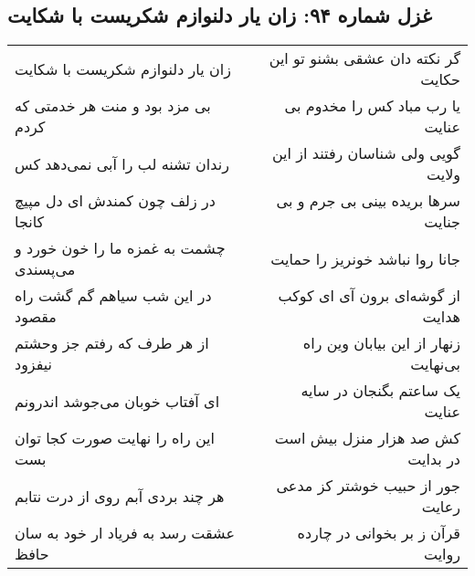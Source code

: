 \begin{center}
\section*{غزل شماره ۹۴: زان یار دلنوازم شکریست با شکایت}
\label{sec:sh094}
\begin{longtable}{l p{0.5cm} r}
زان یار دلنوازم شکریست با شکایت
&&
گر نکته دان عشقی بشنو تو این حکایت
\\
بی مزد بود و منت هر خدمتی که کردم
&&
یا رب مباد کس را مخدوم بی عنایت
\\
رندان تشنه لب را آبی نمی‌دهد کس
&&
گویی ولی شناسان رفتند از این ولایت
\\
در زلف چون کمندش ای دل مپیچ کانجا
&&
سرها بریده بینی بی جرم و بی جنایت
\\
چشمت به غمزه ما را خون خورد و می‌پسندی
&&
جانا روا نباشد خونریز را حمایت
\\
در این شب سیاهم گم گشت راه مقصود
&&
از گوشه‌ای برون آی ای کوکب هدایت
\\
از هر طرف که رفتم جز وحشتم نیفزود
&&
زنهار از این بیابان وین راه بی‌نهایت
\\
ای آفتاب خوبان می‌جوشد اندرونم
&&
یک ساعتم بگنجان در سایه عنایت
\\
این راه را نهایت صورت کجا توان بست
&&
کش صد هزار منزل بیش است در بدایت
\\
هر چند بردی آبم روی از درت نتابم
&&
جور از حبیب خوشتر کز مدعی رعایت
\\
عشقت رسد به فریاد ار خود به سان حافظ
&&
قرآن ز بر بخوانی در چارده روایت
\\
\end{longtable}
\end{center}

